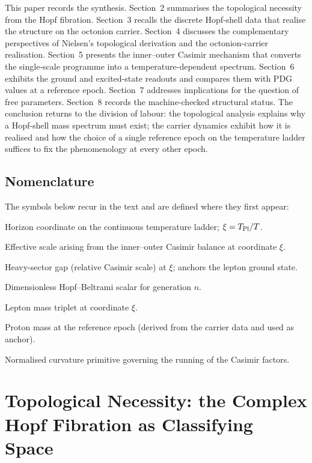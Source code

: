 \documentclass[11pt]{amsart}
\begin{document}
This paper records the synthesis. Section~2 summarises the topological necessity from the Hopf fibration. Section~3 recalls the discrete Hopf-shell data that realise the structure on the octonion carrier. Section~4 discusses the complementary perspectives of Nielsen's topological derivation and the octonion-carrier realisation. Section~5 presents the inner--outer Casimir mechanism that converts the single-scale programme into a temperature-dependent spectrum. Section~6 exhibits the ground and excited-state readouts and compares them with PDG values at a reference epoch. Section~7 addresses implications for the question of free parameters. Section~8 records the machine-checked structural status. The conclusion returns to the division of labour: the topological analysis explains why a Hopf-shell mass spectrum must exist; the carrier dynamics exhibit how it is realised and how the choice of a single reference epoch on the temperature ladder suffices to fix the phenomenology at every other epoch.

\subsection{Nomenclature}
The symbols below recur in the text and are defined where they first appear:
\begin{description}[leftmargin=1.5em]
\item[$\xi$] Horizon coordinate on the continuous temperature ladder; $\xi = T_{\rm Pl}/T$.
\item[$\Lambda_{\rm eff}(\xi)$] Effective scale arising from the inner--outer Casimir balance at coordinate $\xi$.
\item[$G(\xi)$] Heavy-sector gap (relative Casimir scale) at $\xi$; anchors the lepton ground state.
\item[$M_n^{\mathrm{Hopf}}$] Dimensionless Hopf--Beltrami scalar for generation $n$.
\item[$m_n(\xi)$] Lepton mass triplet at coordinate $\xi$.
\item[$M_p^{\mathrm{derived}}$] Proton mass at the reference epoch (derived from the carrier data and used as anchor).
\item[$\omega K(\xi)$] Normalised curvature primitive governing the running of the Casimir factors.
\end{description}

\section{Topological Necessity: the Complex Hopf Fibration as Classifying Space}
\end{document}
